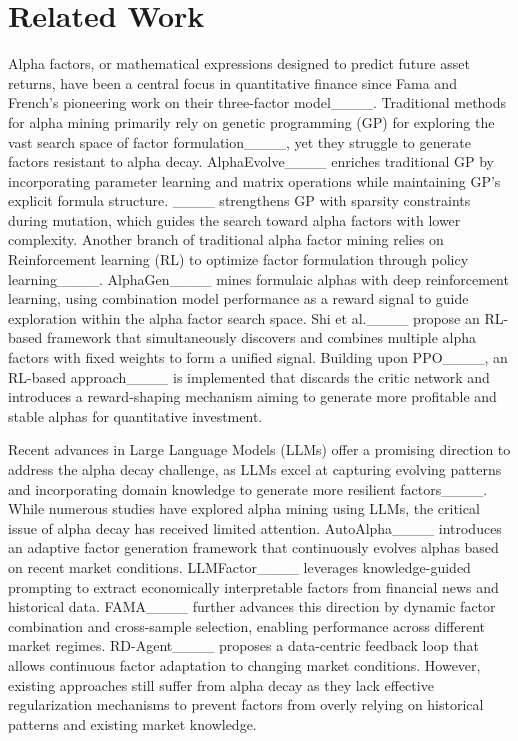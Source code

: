 \section{Related Work}
Alpha factors, or mathematical expressions designed to predict future asset returns, have been a central focus in quantitative finance since Fama and French's pioneering work on their three-factor model____. Traditional methods for alpha mining primarily rely on genetic programming (GP) for exploring the vast search space of factor formulation____, yet they struggle to generate factors resistant to alpha decay. 
%
AlphaEvolve____ enriches traditional GP by incorporating parameter learning and matrix operations while maintaining GP's explicit formula structure. ____ strengthens GP with sparsity constraints during mutation, which guides the search toward alpha factors with lower complexity. 
%
Another branch of traditional alpha factor mining relies on Reinforcement learning (RL) to optimize factor formulation through policy learning____. AlphaGen____ mines formulaic alphas with deep reinforcement learning, using combination model performance as a reward signal to guide exploration within the alpha factor search space. Shi et al.____ propose an RL-based framework that simultaneously discovers and combines multiple alpha factors with fixed weights to form a unified signal. 
%
Building upon PPO____, an RL-based approach____ is implemented that discards the critic network and introduces a reward-shaping mechanism aiming to generate more profitable and stable alphas for quantitative investment. 
%

Recent advances in Large Language Models (LLMs) offer a promising direction to address the alpha decay challenge, as LLMs excel at capturing evolving patterns and incorporating domain knowledge to generate more resilient factors____. While numerous studies have explored alpha mining using LLMs, the critical issue of alpha decay has received limited attention. AutoAlpha____ introduces an adaptive factor generation framework that continuously evolves alphas based on recent market conditions. LLMFactor____ leverages knowledge-guided prompting to extract economically interpretable factors from financial news and historical data. FAMA____ further advances this direction by dynamic factor combination and cross-sample selection, enabling performance across different market regimes. RD-Agent____ proposes a data-centric feedback loop that allows continuous factor adaptation to changing market conditions. However, existing approaches still suffer from alpha decay as they lack effective regularization mechanisms to prevent factors from overly relying on historical patterns and existing market knowledge.

